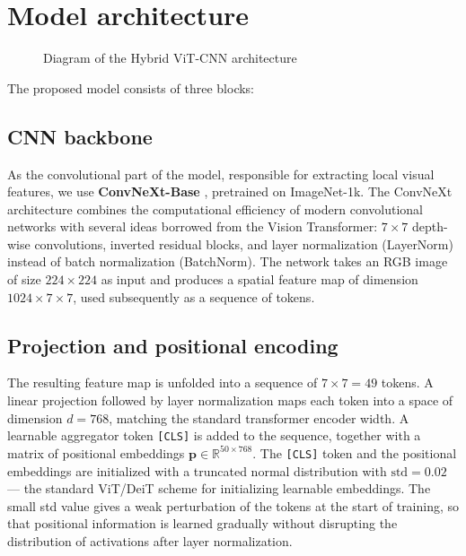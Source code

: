 \documentclass[14pt,a4paper]{extreport}
\begin{document}
\section{Model architecture}

\begin{figure}[H]
\centering
{}
\caption{Diagram of the Hybrid ViT-CNN architecture}
\label{fig:architecture}
\end{figure}

The proposed model consists of three blocks:

\subsection{CNN backbone}

As the convolutional part of the model, responsible for extracting local
visual features, we use \textbf{ConvNeXt-Base} \cite{liu2022convnext},
pretrained on ImageNet-1k. The ConvNeXt architecture combines the
computational efficiency of modern convolutional networks with several
ideas borrowed from the Vision Transformer: $7 \times 7$ depth-wise
convolutions, inverted residual blocks, and layer normalization
(LayerNorm) instead of batch normalization (BatchNorm). The network
takes an RGB image of size $224 \times 224$ as input and produces a
spatial feature map of dimension $1024 \times 7 \times 7$, used
subsequently as a sequence of tokens.

\subsection{Projection and positional encoding}

The resulting feature map is unfolded into a sequence of
$7 \times 7 = 49$ tokens. A linear projection followed by layer
normalization maps each token into a space of dimension $d=768$,
matching the standard transformer encoder width. A learnable aggregator
token \texttt{[CLS]} is added to the sequence, together with a matrix of
positional embeddings $\mathbf{p} \in \mathbb{R}^{50 \times 768}$. The
\texttt{[CLS]} token and the positional embeddings are initialized with
a truncated normal distribution with $\text{std} = 0.02$ --- the
standard ViT/DeiT scheme for initializing learnable embeddings. The
small std value gives a weak perturbation of the tokens at the start of
training, so that positional information is learned gradually without
disrupting the distribution of activations after layer normalization.
\end{document}
